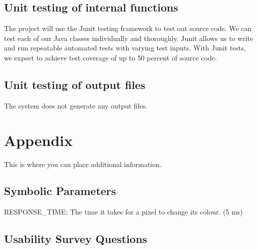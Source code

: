\documentclass[12pt, titlepage]{article}
\begin{document}
\subsection{Unit testing of internal functions}

The project will use the Junit testing framework to test out source code. We can test each of our Java classes individually and thoroughly. Junit allows us to write and run repeatable automated tests with varying test inputs. With Junit tests, we expect to achieve test coverage of up to 50 percent of source code.

\subsection{Unit testing of output files}

The system does not generate any output files.





\newpage

\section{Appendix}

This is where you can place additional information.

\subsection{Symbolic Parameters}
RESPONSE\_TIME: The time it takes for a pixel to change its colour. (5 ms)

\subsection{Usability Survey Questions}
\end{document}
